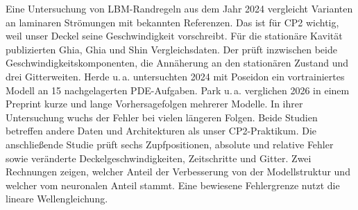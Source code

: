 Eine Untersuchung von LBM-Randregeln aus dem Jahr 2024 vergleicht Varianten an laminaren Strömungen mit bekannten Referenzen. Das ist für CP2 wichtig, weil unser Deckel seine Geschwindigkeit vorschreibt. Für die stationäre Kavität publizierten Ghia, Ghia und Shin Vergleichsdaten. Der  prüft inzwischen beide Geschwindigkeitskomponenten, die Annäherung an den stationären Zustand und drei Gitterweiten.
Herde u.\,a. untersuchten 2024 mit Poseidon ein vortrainiertes Modell an 15 nachgelagerten PDE-Aufgaben. Park u.\,a. verglichen 2026 in einem Preprint kurze und lange Vorhersagefolgen mehrerer Modelle. In ihrer Untersuchung wuchs der Fehler bei vielen längeren Folgen. Beide Studien betreffen andere Daten und Architekturen als unser CP2-Praktikum.
Die anschließende Studie prüft sechs Zupfpositionen, absolute und relative Fehler sowie veränderte Deckelgeschwindigkeiten, Zeitschritte und Gitter. Zwei Rechnungen zeigen, welcher Anteil der Verbesserung von der Modellstruktur und welcher vom neuronalen Anteil stammt. Eine bewiesene Fehlergrenze nutzt die lineare Wellengleichung.

